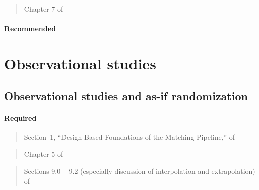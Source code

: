 \documentclass[12pt]{article}
\begin{document}
\begin{verse} Chapter 7 of  \end{verse}

\paragraph*{Recommended}

\begin{verse}  \end{verse}

\begin{verse}  \end{verse}

\begin{verse}  \end{verse}

\begin{verse}  \end{verse}

\begin{verse}  \end{verse}

\begin{verse}  \end{verse}

\section{Observational studies}

\subsection{Observational studies and as-if randomization}

\paragraph*{Required}

\begin{verse} Section~1, ``Design-Based Foundations of the Matching Pipeline,'' of  \end{verse}

\begin{verse} Chapter 5 of  \end{verse}

\begin{verse} Sections 9.0 -- 9.2 (especially discussion of interpolation and extrapolation) of  \end{verse}
\end{document}
